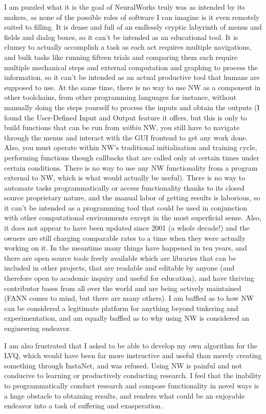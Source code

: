 \documentclass[12pt]{article}
\begin{document}
I am puzzled what it is the goal of NeuralWorks truly was as intended by its makers, as none of the possible roles of software I can imagine is it even remotely suited to filling.  It is dense and full of an endlessly cryptic labyrinth of menus and fields and dialog boxes, so it can't be intended as an educational tool.  It is clumsy to actually accomplish a task as each act requires multiple navigations, and bulk tasks like running fifteen trials and comparing them each require multiple mechanical steps and external computation and graphing to process the information, so it can't be intended as an actual productive tool that humans are supposed to use.  At the same time, there is no way to use NW as a component in other toolchains, from other programming languages for instance, without manually doing the steps yourself to process the inputs and obtain the outputs (I found the User-Defined Input and Output feature it offers, but this is only to build functions that can be run from \emph{within} NW, you still have to navigate through the menus and interact with the GUI frontend to get any work done.  Also, you must operate within NW's traditional initialization and training cycle, performing functions though callbacks that are called only at certain times under certain conditions.  There is no way to use any NW functionality from a program external to NW, which is what would actually be useful).  There is no way to automate tasks programmatically or access functionality thanks to its closed source proprietary nature, and the manual labor of getting results is laborious, so it can't be intended as a programming tool that could be used in conjunction with other computational environments except in the most superficial sense.  Also, it does not appear to have been updated since 2001 (a whole decade!) and the owners are still charging comparable rates to a time when they were actually working on it.  In the meantime many things have happened in ten years, and there are open source tools freely available which are libraries that can be included in other projects, that are readable and editable by anyone (and therefore open to academic inquiry and useful for education), and have thriving contributor bases from all over the world and are being actively maintained (FANN comes to mind, but there are many others).  I am baffled as to how NW can be considered a legitimate platform for anything beyond tinkering and experimentation, and am equally baffled as to why using NW is considered an engineering endeavor.  

I am also frustrated that I asked to be able to develop my own algorithm for the LVQ, which would have been far more instructive and useful than merely creating something through InstaNet, and was refused.  Using NW is painful and not conducive to learning or productively conducting research.  I feel that the inability to programmatically conduct research and compose functionality in novel ways is a huge obstacle to obtaining results, and renders what could be an enjoyable endeavor into a task of suffering and exasperation.  
\end{document}
